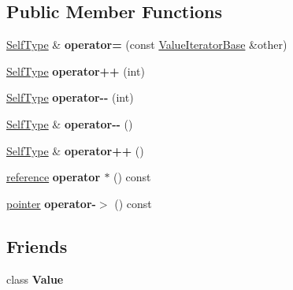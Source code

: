 \subsection*{Public Member Functions}
\begin{DoxyCompactItemize}
\item 
\mbox{\label{class_json_1_1_value_const_iterator_afca9f2ee621a4a47f3e61d6144ce3d0c}} 
\mbox{\hyperlink{class_json_1_1_value_iterator_base}{Self\+Type}} \& {\bfseries operator=} (const \mbox{\hyperlink{class_json_1_1_value_iterator_base}{Value\+Iterator\+Base}} \&other)
\item 
\mbox{\label{class_json_1_1_value_const_iterator_ab3f0c2edbfc8f7d60645f3d597d05e28}} 
\mbox{\hyperlink{class_json_1_1_value_iterator_base}{Self\+Type}} {\bfseries operator++} (int)
\item 
\mbox{\label{class_json_1_1_value_const_iterator_a94935961e9331c6f7b907b05ec8df75e}} 
\mbox{\hyperlink{class_json_1_1_value_iterator_base}{Self\+Type}} {\bfseries operator-\/-\/} (int)
\item 
\mbox{\label{class_json_1_1_value_const_iterator_a31415e44e44e56fb2bfda7e8bb784646}} 
\mbox{\hyperlink{class_json_1_1_value_iterator_base}{Self\+Type}} \& {\bfseries operator-\/-\/} ()
\item 
\mbox{\label{class_json_1_1_value_const_iterator_a2cfe2f7a94a688186efdafb1b181c319}} 
\mbox{\hyperlink{class_json_1_1_value_iterator_base}{Self\+Type}} \& {\bfseries operator++} ()
\item 
\mbox{\label{class_json_1_1_value_const_iterator_a3b161e2774513c08173b06e1ddcaad94}} 
\mbox{\hyperlink{class_json_1_1_value}{reference}} {\bfseries operator $\ast$} () const
\item 
\mbox{\label{class_json_1_1_value_const_iterator_a3c608ae53c192ee846eb265bae1cfeec}} 
\mbox{\hyperlink{class_json_1_1_value}{pointer}} {\bfseries operator-\/$>$} () const
\end{DoxyCompactItemize}
\subsection*{Friends}
\begin{DoxyCompactItemize}
\item 
\mbox{\label{class_json_1_1_value_const_iterator_aeceedf6e1a7d48a588516ce2b1983d6f}} 
class {\bfseries Value}
\end{DoxyCompactItemize}
